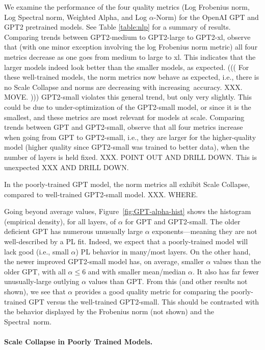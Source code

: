 We examine the performance of the four quality metrics (Log Frobenius norm, Log Spectral norm, Weighted Alpha, and Log $\alpha$-Norm) for the OpenAI GPT and GPT2 pretrained models.
See Table \ref{table:nlp} for a summary of results.
%
Comparing trends between GPT2-medium to GPT2-large to GPT2-xl,
observe that (with one minor exception involving the log Frobenius norm metric) all four metrics decrease as one goes from medium to large to xl.
This indicates that the larger models indeed look better than the smaller models, as expected.
(((
For these well-trained models, the norm metrics now behave as expected, i.e., there is no Scale Collapse and norms are decreasing with increasing~accuracy.
XXX.  MOVE.
)))
GPT2-small violates this general trend, but only very slightly.
This could be due to under-optimization of the GPT2-small model, or since it is the smallest, and these metrics are most relevant for models at scale.
%
Comparing trends between GPT and GPT2-small, 
observe that all four metrics increase when going from GPT to GPT2-small, i.e., they are larger for the higher-quality model (higher quality since GPT2-small was trained to better data), when the number of layers is held fixed.
XXX.  POINT OUT AND DRILL DOWN.
This is unexpected XXX AND DRILL DOWN.

In the poorly-trained GPT model, the norm metrics all exhibit Scale Collapse, compared to well-trained GPT2-small model.
XXX.  WHERE.

Going beyond average values, Figure~\ref{fig:GPT-alpha-hist} shows the histogram (empirical density), for all layers, of $\alpha$ for GPT and GPT2-small.  
The older deficient GPT has numerous unusually large $\alpha$ exponents---meaning they are not well-described by a PL fit.
Indeed, we expect that a poorly-trained model will lack good (i.e., small $\alpha$) PL behavior in many/most layers.
On the other hand, the newer improved GPT2-small model has, on average, smaller $\alpha$ values than the older GPT, with all $\alpha\le6$ and with smaller mean/median $\alpha$.
It also has far fewer unusually-large outlying $\alpha$ values than GPT.
From this (and other results not shown), we see that $\alpha$ provides a good quality metric for comparing the poorly-trained GPT versus the well-trained GPT2-small.
This should be contrasted with the behavior displayed by the Frobenius norm (not shown) and the Spectral~norm.


\paragraph{Scale Collapse in Poorly Trained Models.}


